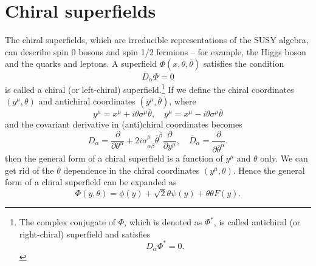 \documentclass[12pt]{report}
\begin{document}
\section{Chiral superfields}
The chiral superfields, which are irreducible representations of the SUSY algebra, can describe spin 0 bosons and spin 1/2 fermions -- for example, the Higgs boson and the quarks and leptons.
A superfield $\Phi (x, \theta, \overline{\theta})$ satisfies the condition
\begin{equation} \label{eq: definition of chiral superfield}
\overline{D}_{\dot{\alpha}} \Phi =0
\end{equation}
 is called a chiral (or left-chiral) superfield.\footnote{The complex conjugate of $\Phi$, which is denoted as $\Phi^{*}$, is called antichiral (or right-chiral) superfield and satisfies
\begin{equation} \label{eq: definition of antichiral superfield}
D_{\alpha} \Phi^{*} = 0.
\end{equation}
}
If we define the chiral coordinates $(y^{\mu}, \theta)$ and antichiral coordinates $(\overline{y}^{\mu}, \overline{\theta})$, where
\begin{equation}
y^{\mu} = x^{\mu} + i \theta \sigma^{\mu} \overline{\theta}, \quad 
\overline{y}^{\mu} = x^{\mu} - i \theta \sigma^{\mu} \overline{\theta}
\end{equation}
and the covariant derivative in (anti)chiral coordinates becomes
\begin{equation}
D_{\alpha} = \frac{\partial}{\partial \theta^{\alpha}} + 2 i \sigma^{\mu}_{\alpha \dot{\beta}} \overline{\theta}^{\dot{\beta}} \frac{\partial}{\partial y^{\mu}}, \quad 
\overline{D}_{\dot{\alpha}} = \frac{\partial}{\partial \overline{\theta}^{\dot{\alpha}}} .
\end{equation}
then the general form of a chiral superfield is a function of $y^{\mu}$ and $\theta$ only.
We can get rid of the $\overline{\theta}$ dependence in the chiral coordinates $(y^{\mu}, \theta)$.
Hence the general form of a chiral superfield can be expanded as
\begin{equation}
\Phi (y, \theta) = \phi (y) + \sqrt{2} \theta \psi (y) + \theta \theta F(y) .
\end{equation}
\end{document}
